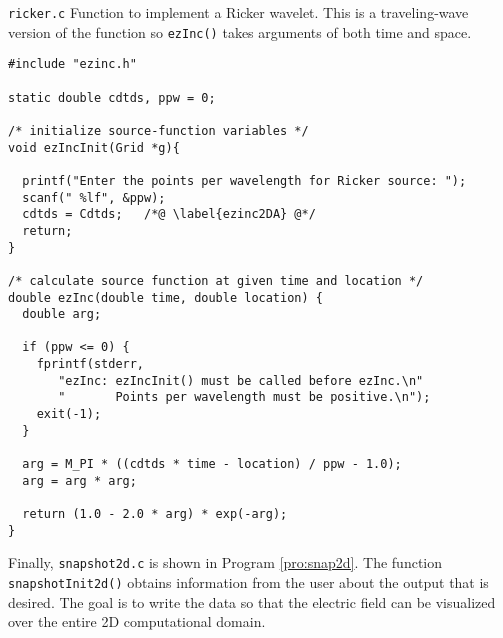 \begin{program}
{\tt ricker.c} 
Function to implement a Ricker wavelet.  This is a traveling-wave
version of the function so {\tt ezInc()} takes arguments of both time
and space.
\label{pro:ricker}
\codemiddle
\begin{lstlisting}
#include "ezinc.h"

static double cdtds, ppw = 0;

/* initialize source-function variables */
void ezIncInit(Grid *g){

  printf("Enter the points per wavelength for Ricker source: ");
  scanf(" %lf", &ppw);
  cdtds = Cdtds;   /*@ \label{ezinc2DA} @*/
  return;
}

/* calculate source function at given time and location */
double ezInc(double time, double location) {
  double arg;

  if (ppw <= 0) {
    fprintf(stderr,
       "ezInc: ezIncInit() must be called before ezInc.\n"
       "       Points per wavelength must be positive.\n");
    exit(-1);
  }

  arg = M_PI * ((cdtds * time - location) / ppw - 1.0);
  arg = arg * arg;

  return (1.0 - 2.0 * arg) * exp(-arg);
}
\end{lstlisting}
\end{program}

Finally, {\tt snapshot2d.c} is shown in Program \ref{pro:snap2d}.  The
function {\tt snapshotInit2d()} obtains information from the user
about the output that is desired.  The goal is to write the data so
that the electric field can be visualized over the entire 2D
computational domain.

